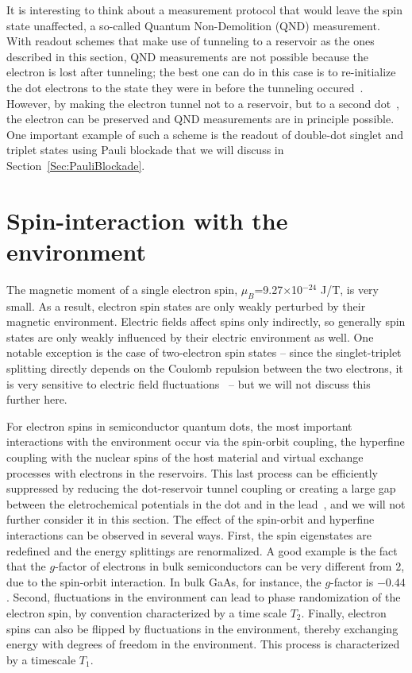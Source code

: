 \documentclass[12pt,aps,nofootinbib]{revtex4-1}
\begin{document}
It is interesting to think about a measurement protocol that would leave the spin state unaffected, a so-called Quantum Non-Demolition (QND) measurement. With readout schemes that make use of tunneling to a reservoir as the ones described in this section, QND measurements are not possible because the electron is lost after tunneling; the best one can do in this case is to re-initialize the dot electrons to the state they were in before the tunneling occured~\cite{Meunier06}. However, by making the electron tunnel not to a reservoir, but to a second dot~\cite{EngelPRL2004,EngelScience05}, the electron can be preserved and QND measurements are in principle possible. One important example of such a scheme is the readout of double-dot singlet and triplet states using Pauli blockade that we will discuss in Section~\ref{Sec:PauliBlockade}.


\section{Spin-interaction with the environment}
\label{Spinenvironment}

The magnetic moment of a single electron spin,
$\mu_B$=9.27$\times$10$^{-24}$ J/T, is very small. As a result,
electron spin states are only weakly perturbed by their magnetic
environment. Electric fields affect spins only indirectly, so generally spin states are only weakly influenced by their electric environment as well. One notable exception is the case of two-electron spin states -- since the singlet-triplet splitting directly depends on the Coulomb repulsion between the two electrons, it is very sensitive to electric field fluctuations~\cite{Hu06} -- but we will not discuss this further here.

For electron spins in semiconductor quantum dots, the most important interactions with the environment occur via the spin-orbit coupling, the hyperfine coupling with the nuclear spins of the host material and virtual exchange processes with electrons
in the reservoirs. This last process can be efficiently suppressed by
reducing the dot-reservoir tunnel coupling or creating a large gap between the eletrochemical potentials in the dot and in the lead~\cite{FujisawaNature2002}, and we will not
further consider it in this section. The effect of the spin-orbit
and hyperfine interactions can be observed in several ways. First,
the spin eigenstates are redefined and the energy splittings are
renormalized. A good example is the fact that the $g$-factor of
electrons in bulk semiconductors can be very different from $2$,
due to the spin-orbit interaction. In bulk GaAs, for instance, the
$g$-factor is $-0.44$. Second, fluctuations in the environment can
lead to phase randomization of the electron spin, by convention
characterized by a time scale $T_2$. Finally, electron spins can
also be flipped by fluctuations in the environment, thereby
exchanging energy with degrees of freedom in the environment. This
process is characterized by a timescale $T_1$.
\end{document}
